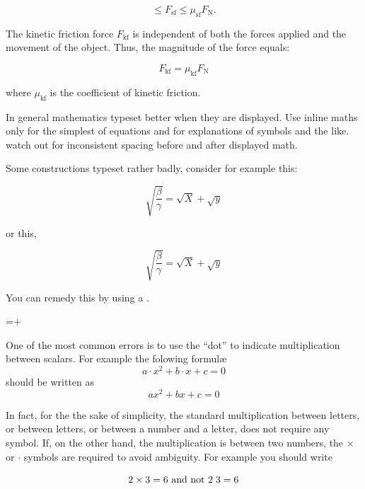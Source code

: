 {{\[ \le F_{\mathrm{sf}} \le \mu_{\mathrm{sf}} F_\mathrm{N}. \]

The kinetic friction force \(F_{\mathrm{kf}}\) is independent of both the forces applied and the movement of the object. Thus, the magnitude of the force equals:

\[F_{\mathrm{kf}} = \mu_{\mathrm{kf}} F_\mathrm{N}\]

where \(\mu_{\mathrm{kf}}\) is the coefficient of kinetic friction.
}






In general mathematics typeset better when they are displayed. Use inline maths only for the simplest of equations and for explanations of symbols and the like. watch out for inconsistent spacing before and after displayed math.


Some \tex constructions typeset rather badly, consider for example this:

\[
\sqrt{\frac{\beta}{\gamma}} = \sqrt{X} + \sqrt{y}
\]

\noindent or this,

\[
\surd{\frac{\beta}{\gamma}} = \surd{X} + \surd{y}
\]


You can remedy this by using a .


\begin{teXX}
=+
\end{teXX}


One of the most common errors is to use the ``dot'' to indicate multiplication between scalars. For example the folowing formul\ae
\[a\cdot x^2+b\cdot x+c=0\]
should be written as
\[ax^2+bx+c=0\]

In fact, for the the sake of simplicity, the standard multiplication between letters, or between letters, or between a number and a letter, does not require any symbol. If, on the other hand, the multiplication is between two numbers, the $\times$ or $\cdot$ symbols are required to avoid ambiguity.
For example you should write

\[2\times 3=6 \text{ and not } 2\thickspace 3=6 \]


}
